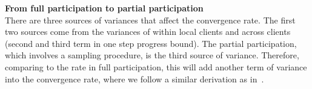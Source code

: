 \textbf{From full participation to partial participation}\\
There are three sources of variances that affect the convergence rate.
The first two sources come from the variances of within local clients and
across clients (second and third term in one step progress bound). 
The partial participation, which involves a sampling procedure, is the third
source of variance. Therefore, comparing to the rate in full participation, this will add another term of variance into the convergence rate, where we follow a similar derivation as in~\cite{li2019convergence}.

